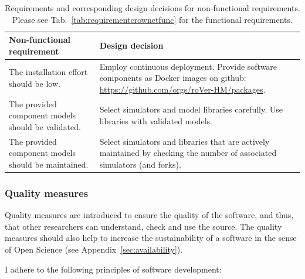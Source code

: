 \begin{table}[hbt!]
\begin{tabular}{|p{7cm}|p{7cm}|}
\hline
\textbf{Non-functional requirement} & \textbf{Design decision}  \\
\hline 
The installation effort should be low. & Employ continuous deployment. Provide software components as Docker images on github: \url{https://github.com/orgs/roVer-HM/packages}.  \\ \hline
The provided component models should be validated. & Select simulators and model libraries carefully. Use libraries with validated models. \\ \hline
The provided component models should be maintained. & Select simulators and libraries that are actively maintained by checking the number of associated simulators (and forks). \\ \hline
\end{tabular} 
\caption[]{Requirements and corresponding design decisions for non-functional requirements. Please see Tab.~\ref{tab:requirementcrownetfunc} for the functional requirements. }
\label{tab:requirementcrownetnon}
\end{table}


\FloatBarrier

\subsubsection{Quality measures}

Quality measures are introduced to ensure the quality of the software, and thus, that other researchers can understand, check and use the source. The quality measures should also help to increase the sustainability of a software in the sense of Open Science (see Appendix~\ref{sec:availability}). 

I adhere to the following principles of software development:

